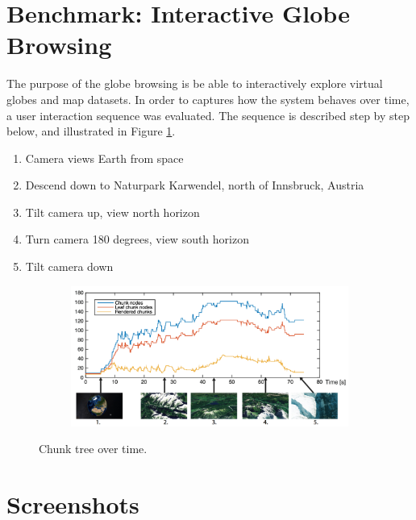 \clearpage
\section{Benchmark: Interactive Globe Browsing}
\FloatBarrier
The purpose of the globe browsing is be able to interactively explore virtual globes and map datasets. In order to captures how the system behaves over time, a user interaction sequence was evaluated. The sequence is described step by step below, and illustrated in Figure \ref{fig:interaction}.

\begin{enumerate}
  \item Camera views Earth from space
  \item Descend down to Naturpark Karwendel, north of Innsbruck, Austria
  \item Tilt camera up, view north horizon
  \item Turn camera 180 degrees, view south horizon
  \item Tilt camera down
\end{enumerate}

\begin{figure}[h]
    \centering
    \begin{subfigure}[bt]{1.0\textwidth}
        \includegraphics[width=\textwidth]{figures/results/globebrowsing.png}
    \end{subfigure}
    \caption{Chunk tree over time.}
    \label{fig:interaction}
\end{figure}

\section{Screenshots}
\FloatBarrier
